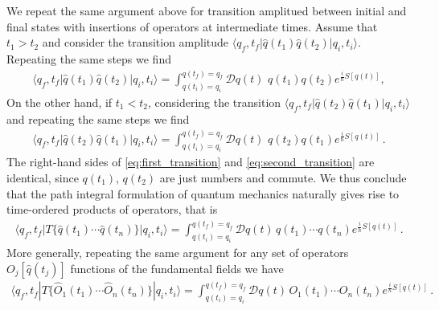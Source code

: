 \documentclass[../QFT_main.tex]{subfiles}
\begin{document}
\begin{mytheorem}
%
We repeat the same argument above for transition amplitued between initial and final states with insertions of operators at intermediate times.
Assume that $t_1>t_2$ and consider the transition amplitude $\langle q_f, t_f | \hat{q}(t_1)\hat{q}(t_2) | q_i, t_i \rangle$.
Repeating the same steps we find
{\small\begin{align}\label{eq:first_transition}
    \langle q_f, t_f | \hat{q}(t_1)\hat{q}(t_2) | q_i, t_i \rangle = \int_{q(t_i)=q_i}^{q(t_f)=q_f} \!\!\!\!\!\!\!\mathcal{D}q(t)\,\, q(t_1)q(t_2) e^{\frac{i}{\hbar}S[q(t)]},
\end{align}}
On the other hand, if $t_1< t_2$, considering the transition $\langle q_f, t_f | \hat{q}(t_2)\hat{q}(t_1) | q_i, t_i \rangle$ and repeating the same steps we find
{\small\begin{align}\label{eq:second_transition}
    \langle q_f, t_f | \hat{q}(t_2)\hat{q}(t_1) | q_i, t_i \rangle = \int_{q(t_i)=q_i}^{q(t_f)=q_f} \!\!\!\!\!\!\!\mathcal{D}q(t)\,\, q(t_2) q(t_1)e^{\frac{i}{\hbar}S[q(t)]}\,.
\end{align}}
The right-hand sides of \eqref{eq:first_transition} and \eqref{eq:second_transition} are identical, since $q(t_1),\,q(t_2)$ are just numbers and commute.
We thus conclude that the path integral formulation of quantum mechanics naturally gives rise to time-ordered products of operators, that is
{\small\begin{align}
    \langle q_f, t_f | T\{ \hat{q}(t_1) \cdots \hat{q}(t_n) \} | q_i, t_i \rangle = \int_{q(t_i)=q_i}^{q(t_f)=q_f} \mathcal{D}q(t)\, q(t_1)\cdots q(t_n) e^{\frac{i}{\hbar}S[q(t)]}\,.
\end{align}}
More generally, repeating the same argument for any set of operators $O_j[\hat{q}(t_j)]$ functions of the fundamental fields we have
{\small\begin{align}
    \langle q_f, t_f | T\{ \hat{O}_1(t_1) \cdots \hat{O}_n(t_n) \} | q_i, t_i \rangle = \int_{q(t_i)=q_i}^{q(t_f)=q_f}\!\!\!\!\!\!\! \mathcal{D}q(t)\, O_1(t_1)\cdots O_n(t_n) e^{\frac{i}{\hbar}S[q(t)]}\,.
\end{align}}
%
\end{mytheorem}
\end{document}
